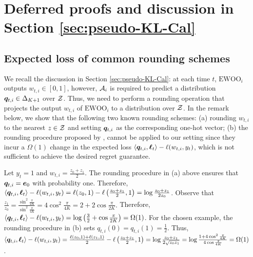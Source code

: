 \section{Deferred proofs and discussion in Section \ref{sec:pseudo-KL-Cal}}\label{app:deferred_proofs_pseudo_KL_Cal}
\subsection{Expected loss of common rounding schemes}
We recall the discussion in Section \ref{sec:pseudo-KL-Cal}:
at each time $t$, $\text{EWOO}_{i}$ outputs $w_{t, i} \in [0, 1]$, however, $\mathcal{A}_{i}$ is required to predict a distribution ${\bm{q}}_{t, i} \in \Delta_{K + 1}$ over $\mathcal{Z}$. Thus, we need to perform a rounding operation that projects the output $w_{t, i}$ of $\text{EWOO}_{i}$ to a distribution over $\mathcal{Z}$. 
In the remark below,
we show that the following two known rounding schemes: (a) rounding $w_{t, i}$ to the nearest $z \in \mathcal{Z}$ and setting ${\bm{q}}_{t, i}$ as the corresponding one-hot vector; (b) the rounding procedure proposed by \cite{fishelsonfull}, cannot be applied to our setting since they incur a $\Omega(1)$ change in the expected loss $\left\langle {\ensuremath{\bm{q}}}_{t, i}, \bm{\ell}_{t} \right\rangle - \ell(w_{t, i}, y_{t})$, which is not sufficient to achieve the desired regret guarantee.

\begin{remark}\label{rem:rounding}
    Let $y_{t} = 1$ and $w_{t, i} = \frac{z_{0} + z_{1}}{2}$. The rounding procedure in (a) above ensures that ${\bm{q}}_{t, i} = {\bm{e}}_{0}$ with probability one. Therefore, $\left\langle {\ensuremath{\bm{q}}}_{t, i}, \bm{\ell}_{t} \right\rangle - \ell(w_{t, i}, y_{t}) = \ell(z_{0}, 1) - \ell\left( \frac{z_{0} + z_{1}}{2}, 1 \right) = \log \frac{z_{0} + z_{1}}{2z_{0}}$. Observe that $\frac{z_{1}}{z_{0}} = \frac{\sin ^ {2} \frac{\pi}{2K}}{\sin ^ {2} \frac{\pi}{4K}} = 4 \cos ^ {2} \frac{\pi}{4K} = 2 + 2 \cos \frac{\pi}{2K}.$ Therefore, $\left\langle {\ensuremath{\bm{q}}}_{t, i}, \bm{\ell}_{t} \right\rangle - \ell(w_{t, i}, y_{t}) = \log \left( \frac{3}{2} + \cos \frac{\pi}{2K} \right) = \Omega(1)$. For the chosen example, the rounding procedure in (b) sets $q_{t, i}(0) = q_{t, i}(1) = \frac{1}{2}$. Thus, $\left\langle {\ensuremath{\bm{q}}}_{t, i}, \bm{\ell}_{t} \right\rangle - \ell(w_{t, i}, y_{t}) = \frac{\ell(z_{0}, 1) + \ell(z_{1}, 1)}{2} - \ell\left( \frac{z_{0} + z_{1}}{2}, 1 \right) = \log \frac{z_{0} + z_{1}}{2\sqrt{z_{0} z_{1}}} = \log \frac{{1 + 4\cos ^ {2} \frac{\pi}{4K}}}{4\cos \frac{\pi}{4K}} = \Omega(1)$. 
\end{remark}

